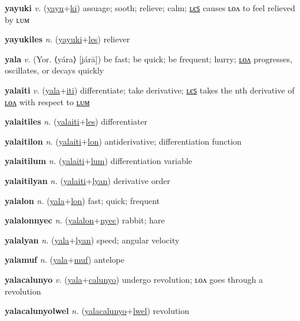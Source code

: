 \textbf{\hypertarget{yayuki}{yayuki}} \textit{v.} (\hyperlink{yayu}{yayu}+\allowbreak \hyperlink{ki}{ki})
assuage; sooth; relieve; calm; \hyperlink{yayukiles}{ʟєꜱ} causes ʟᴏᴧ to feel relieved by ʟᴜᴍ

\textbf{\hypertarget{yayukiles}{yayukiles}} \textit{n.} (\hyperlink{yayuki}{yayuki}+\allowbreak \hyperlink{les}{les})
reliever

\textbf{\hypertarget{yala}{yala}} \textit{v.} (Yor. ⟨yára⟩ [járā])
be fast; be quick; be frequent; hurry; \hyperlink{yalalon}{ʟᴏᴧ} progresses, oscillates, or decays quickly

\textbf{\hypertarget{yalaiti}{yalaiti}} \textit{v.} (\hyperlink{yala}{yala}+\allowbreak \hyperlink{iti}{iti})
differentiate; take derivative; \hyperlink{yalaitiles}{ʟєꜱ} takes the nth derivative of \hyperlink{yalaitilon}{ʟᴏᴧ} with respect to \hyperlink{yalaitilum}{ʟᴜᴍ}

\textbf{\hypertarget{yalaitiles}{yalaitiles}} \textit{n.} (\hyperlink{yalaiti}{yalaiti}+\allowbreak \hyperlink{les}{les})
differentiater

\textbf{\hypertarget{yalaitilon}{yalaitilon}} \textit{n.} (\hyperlink{yalaiti}{yalaiti}+\allowbreak \hyperlink{lon}{lon})
antiderivative; differentiation function

\textbf{\hypertarget{yalaitilum}{yalaitilum}} \textit{n.} (\hyperlink{yalaiti}{yalaiti}+\allowbreak \hyperlink{lum}{lum})
differentiation variable

\textbf{\hypertarget{yalaitilyan}{yalaitilyan}} \textit{n.} (\hyperlink{yalaiti}{yalaiti}+\allowbreak \hyperlink{lyan}{lyan})
derivative order

\textbf{\hypertarget{yalalon}{yalalon}} \textit{n.} (\hyperlink{yala}{yala}+\allowbreak \hyperlink{lon}{lon})
fast; quick; frequent

\textbf{\hypertarget{yalalonnyec}{yalalonnyec}} \textit{n.} (\hyperlink{yalalon}{yalalon}+\allowbreak \hyperlink{nyec}{nyec})
rabbit; hare

\textbf{\hypertarget{yalalyan}{yalalyan}} \textit{n.} (\hyperlink{yala}{yala}+\allowbreak \hyperlink{lyan}{lyan})
speed; angular velocity

\textbf{\hypertarget{yalamuf}{yalamuf}} \textit{n.} (\hyperlink{yala}{yala}+\allowbreak \hyperlink{muf}{muf})
antelope

\textbf{\hypertarget{yalacalunyo}{yalacalunyo}} \textit{v.} (\hyperlink{yala}{yala}+\allowbreak \hyperlink{calunyo}{calunyo})
undergo revolution; ʟᴏᴧ goes through a revolution

\textbf{\hypertarget{yalacalunyolwel}{yalacalunyolwel}} \textit{n.} (\hyperlink{yalacalunyo}{yalacalunyo}+\allowbreak \hyperlink{lwel}{lwel})
revolution

